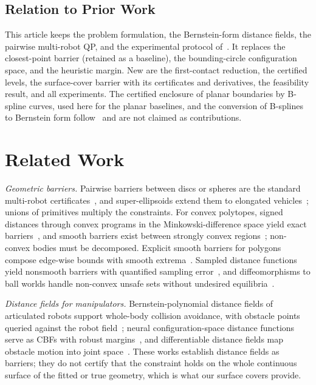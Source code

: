\documentclass[journal]{IEEEtran}
\theoremstyle{definition}
\begin{document}
\subsection{Relation to Prior Work}\label{sec:relation}
This article keeps the problem formulation, the Bernstein-form distance fields, the pairwise
multi-robot QP, and the experimental protocol of~\cite{jo2026geometry}. It replaces the
closest-point barrier (retained as a baseline), the bounding-circle configuration space, and the
heuristic margin. New are the first-contact reduction, the certified levels, the surface-cover
barrier with its certificates and derivatives, the feasibility result, and all experiments. The
certified enclosure of planar boundaries by B-spline curves, used here for the planar baselines, and
the conversion of B-splines to Bernstein form follow~\cite{jo2027semantic} and are not claimed as
contributions.

\section{Related Work}\label{sec:related}

\emph{Geometric barriers.} Pairwise barriers between discs or spheres are the standard multi-robot
certificates~\cite{wang2017safety}, and super-ellipsoids extend them to elongated
vehicles~\cite{wang2017quadrotors}; unions of primitives multiply the constraints. For convex
polytopes, signed distances through convex programs in the Minkowski-difference space yield exact
barriers~\cite{chen2025minkowski,chen2026exact}, and smooth barriers exist between strongly convex
regions~\cite{thirugnanam2025strongly}; non-convex bodies must be decomposed. Explicit smooth
barriers for polygons compose edge-wise bounds with smooth extrema~\cite{wu2025optimization}.
Sampled distance functions yield nonsmooth barriers with quantified sampling
error~\cite{lutkus2025sampling}, and diffeomorphisms to ball worlds handle non-convex unsafe sets
without undesired equilibria~\cite{notomista2021nonconvex}.

\emph{Distance fields for manipulators.} Bernstein-polynomial distance fields of articulated robots
support whole-body collision avoidance, with obstacle points queried against the robot
field~\cite{li2024representing}; neural configuration-space distance functions serve as CBFs with
robust margins~\cite{long2025neural}, and differentiable distance fields map obstacle motion into
joint space~\cite{chi2024safe}. These works establish distance fields as barriers; they do not
certify that the constraint holds on the whole continuous surface of the fitted or true geometry,
which is what our surface covers provide.
\end{document}
